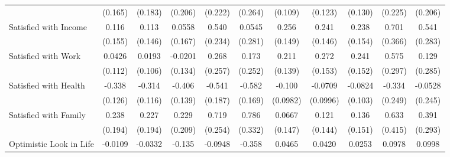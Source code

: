 {\begin{tabular}{l*{10}{c}}
            &     (0.165)         &     (0.183)         &     (0.206)         &     (0.222)         &     (0.264)         &     (0.109)         &     (0.123)         &     (0.130)         &     (0.225)         &     (0.206)         \\
\addlinespace
Satisfied with Income&       0.116         &       0.113         &      0.0558         &       0.540\sym{*}  &      0.0545         &       0.256         &       0.241         &       0.238         &       0.701         &       0.541         \\
            &     (0.155)         &     (0.146)         &     (0.167)         &     (0.234)         &     (0.281)         &     (0.149)         &     (0.146)         &     (0.154)         &     (0.366)         &     (0.283)         \\
\addlinespace
Satisfied with Work&      0.0426         &      0.0193         &     -0.0201         &       0.268         &       0.173         &       0.211         &       0.272         &       0.241         &       0.575         &       0.129         \\
            &     (0.112)         &     (0.106)         &     (0.134)         &     (0.257)         &     (0.252)         &     (0.139)         &     (0.153)         &     (0.152)         &     (0.297)         &     (0.285)         \\
\addlinespace
Satisfied with Health&      -0.338\sym{**} &      -0.314\sym{**} &      -0.406\sym{**} &      -0.541\sym{**} &      -0.582\sym{***}&      -0.100         &     -0.0709         &     -0.0824         &      -0.334         &     -0.0528         \\
            &     (0.126)         &     (0.116)         &     (0.139)         &     (0.187)         &     (0.169)         &    (0.0982)         &    (0.0996)         &     (0.103)         &     (0.249)         &     (0.245)         \\
\addlinespace
Satisfied with Family&       0.238         &       0.227         &       0.229         &       0.719\sym{**} &       0.786\sym{*}  &      0.0667         &       0.121         &       0.136         &       0.633         &       0.391         \\
            &     (0.194)         &     (0.194)         &     (0.209)         &     (0.254)         &     (0.332)         &     (0.147)         &     (0.144)         &     (0.151)         &     (0.415)         &     (0.293)         \\
\addlinespace
Optimistic Look in Life&     -0.0109         &     -0.0332         &      -0.135         &     -0.0948         &      -0.358\sym{**} &      0.0465         &      0.0420         &      0.0253         &      0.0978         &      0.0998         \\

\end{tabular}}
